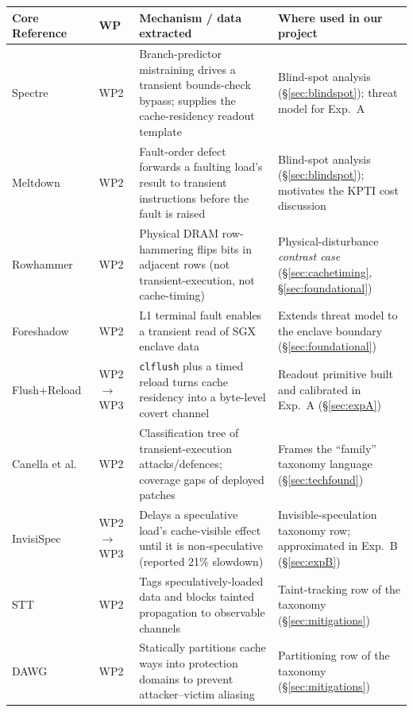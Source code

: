 \documentclass[11pt,a4paper]{article}
\begin{document}
\begin{table}[h]
\centering
\small
\begin{tabular}{@{}p{3.3cm}p{1.2cm}p{4.3cm}p{4.1cm}@{}}
\toprule
\textbf{Core Reference} & \textbf{WP} & \textbf{Mechanism / data extracted} & \textbf{Where used in our project} \\
\midrule
Spectre~\cite{kocher2019spectre} & WP2 & Branch-predictor mistraining drives a transient bounds-check bypass; supplies the cache-residency readout template & Blind-spot analysis (\S\ref{sec:blindspot}); threat model for Exp.\ A \\
\addlinespace
Meltdown~\cite{lipp2018meltdown} & WP2 & Fault-order defect forwards a faulting load's result to transient instructions before the fault is raised & Blind-spot analysis (\S\ref{sec:blindspot}); motivates the KPTI cost discussion \\
\addlinespace
Rowhammer~\cite{kim2014rowhammer} & WP2 & Physical DRAM row-hammering flips bits in adjacent rows (not transient-execution, not cache-timing) & Physical-disturbance \emph{contrast case} (\S\ref{sec:cachetiming}, \S\ref{sec:foundational}) \\
\addlinespace
Foreshadow~\cite{vanbulck2018foreshadow} & WP2 & L1 terminal fault enables a transient read of SGX enclave data & Extends threat model to the enclave boundary (\S\ref{sec:foundational}) \\
\addlinespace
Flush+Reload~\cite{yarom2014flushreload} & WP2 $\to$ WP3 & \texttt{clflush} plus a timed reload turns cache residency into a byte-level covert channel & Readout primitive built and calibrated in Exp.\ A (\S\ref{sec:expA}) \\
\addlinespace
Canella et al.~\cite{canella2019systematic} & WP2 & Classification tree of transient-execution attacks/defences; coverage gaps of deployed patches & Frames the ``family'' taxonomy language (\S\ref{sec:techfound}) \\
\addlinespace
InvisiSpec~\cite{yan2018invisispec} & WP2 $\to$ WP3 & Delays a speculative load's cache-visible effect until it is non-speculative (reported 21\% slowdown) & Invisible-speculation taxonomy row; approximated in Exp.\ B (\S\ref{sec:expB}) \\
\addlinespace
STT~\cite{yu2019stt} & WP2 & Tags speculatively-loaded data and blocks tainted propagation to observable channels & Taint-tracking row of the taxonomy (\S\ref{sec:mitigations}) \\
\addlinespace
DAWG~\cite{kiriansky2018dawg} & WP2 & Statically partitions cache ways into protection domains to prevent attacker--victim aliasing & Partitioning row of the taxonomy (\S\ref{sec:mitigations}) \\

\end{tabular}
\end{table}
\end{document}
